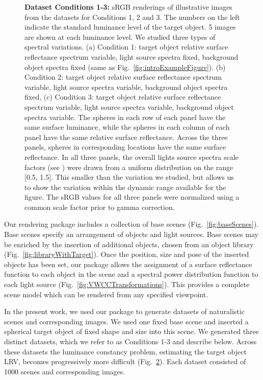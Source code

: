 \documentclass{jov}
\begin{document}
\begin{figure}
\begin{subfigure}[b]{0.33 \textwidth}
        \label{fig:allSpectraVarying}
    \end{subfigure}    
    \caption{{\bf Dataset Conditions 1-3:} sRGB renderings of illustrative images from the datasets for Conditions 1, 2 and 3. The numbers on the left indicate the standard luminance level of the target object. 5 images are shown at each luminance level. We studied three types of spectral variations. (a) Condition 1: target object relative surface reflectance spectrum variable, light source spectra fixed, background object spectra fixed (same as Fig.~\ref{fig:introExampleFigure}).
(b) Condition 2: target object relative surface reflectance spectrum variable, light source spectra variable, background object spectra fixed, (c) Condition 3: target object relative surface reflectance spectrum variable, light source spectra variable, background object spectra variable. The spheres in each row of each panel have the same surface luminance, while the spheres in each column of each panel have the same relative surface reflectance.  Across the three panels, spheres in corresponding locations have the same surface reflectance. In all three panels, the overall lights source spectra scale factors (see ) were drawn from a uniform distribution on the range [0.5, 1.5]. This smaller than the variation we studied, but allows us to show the variation within the dynamic range available for the figure. The sRGB values for all three panels were normalized using a common scale factor prior to gamma correction.} 
\label{fig:studiedCases}
\end{figure}

Our rendering package includes a collection of base scenes (Fig.~\ref{fig:baseScenes}).
Base scenes specify an arrangement of objects and light sources.
Base scenes may be enriched by the insertion of additional objects, chosen from an object library (Fig.~\ref{fig:libraryWithTarget}).
Once the position, size and pose of the inserted objects has been set, 
our package allows the assignment of a surface reflectance function to each object in the scene 
and a spectral power distribution function to each light source (Fig.~\ref{fig:VWCCTransformations}).
This provides a complete scene model which can be rendered from any specified viewpoint.

In the present work, we used our package to generate datasets of naturalistic scenes and corresponding images.
We used one fixed base scene and inserted a spherical target object of fixed shape and size into this scene.
We generated three distinct datasets, which we refer to as Conditions 1-3 and describe below.
Across these datasets the luminance constancy problem, estimating the target object LRV,
becomes progressively more difficult (Fig.~\ref{fig:studiedCases}).
Each dataset consisted of 1000 scenes and corresponding images.
\end{document}
